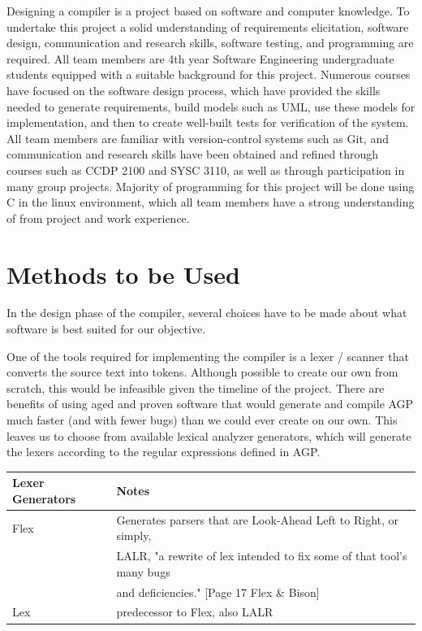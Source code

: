 \documentclass[11pt]{article}
\begin{document}
Designing a compiler is a project based on software and computer knowledge. To undertake this project a solid understanding of requirements elicitation, software design, communication and research skills, software testing, and programming are required.  All team members are 4th year Software Engineering undergraduate students equipped with a suitable background for this project. Numerous courses have focused on the software design process, which have provided the skills needed to generate requirements, build models such as UML, use these models for implementation, and then to create well-built tests for verification of the system. All team members are familiar with version-control systems such as Git, and communication and research skills have been obtained and refined through courses such as CCDP 2100 and SYSC 3110, as well as through participation in many group projects. Majority of programming for this project will be done using C in the linux environment, which all team members have a strong understanding of from project and work experience.


\section{Methods to be Used}

In the design phase of the compiler, several choices have to be made about what software is best suited for our objective. 

One of the tools required for implementing the compiler is a lexer / scanner that converts the source text into tokens. Although possible to create our own from scratch, this would be infeasible given the timeline of the project. There are benefits of using aged and proven software that would generate and compile AGP much faster (and with fewer bugs) than we could ever create on our own. This leaves us to choose from available lexical analyzer generators, which will generate the lexers according to the regular expressions defined in AGP.

\begin{center}
\begin{tabular}{ |l | l|  }
 \hline
 Lexer Generators & Notes \\
 \hline 
 Flex & Generates parsers that are Look-Ahead Left to Right, or simply,\\ 
 	  &
 LALR, "a rewrite of lex intended to fix some of that tool's many bugs \\
 	  &
 and deficiencies." [Page 17 Flex \& Bison] \\ 
 \hline 
 Lex & predecessor to Flex, also LALR \\
 \hline
\end{tabular}
\end{center}
\end{document}
